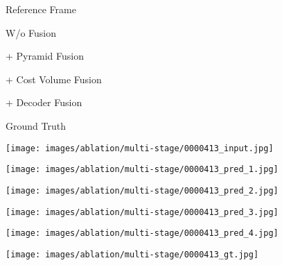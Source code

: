 \documentclass[10pt,twocolumn,letterpaper]{article}
\begin{document}
\begin{figure*}
    \captionsetup[subfigure]{labelformat=empty}
        \begin{subfigure}[b]{0.166\linewidth}
        \caption{Reference Frame}
        \end{subfigure}\hfill
        \begin{subfigure}[b]{0.166\linewidth}
        \caption{W/o Fusion}
        \end{subfigure}\hfill
        \begin{subfigure}[b]{0.166\linewidth}
        \caption{+ Pyramid Fusion}
        \end{subfigure}\hfill
        \begin{subfigure}[b]{0.166\linewidth}
        \caption{+ Cost Volume Fusion}
        \end{subfigure}\hfill
        \begin{subfigure}[b]{0.166\linewidth}
        \caption{+ Decoder Fusion}
        \end{subfigure}\hfill
        \begin{subfigure}[b]{0.166\linewidth}
        \caption{Ground Truth}
        \end{subfigure}\hfill
    \vspace{-3pt}

    \begin{subfigure}[b]{0.166\linewidth}
    \texttt{[image: images/ablation/multi-stage/0000413\_input.jpg]}
    \end{subfigure}\hfill
    \begin{subfigure}[b]{0.166\linewidth}
    \texttt{[image: images/ablation/multi-stage/0000413\_pred\_1.jpg]}
    \end{subfigure}\hfill
    \begin{subfigure}[b]{0.166\linewidth}
    \texttt{[image: images/ablation/multi-stage/0000413\_pred\_2.jpg]}
    \end{subfigure}\hfill
    \begin{subfigure}[b]{0.166\linewidth}
    \texttt{[image: images/ablation/multi-stage/0000413\_pred\_3.jpg]}
    \end{subfigure}\hfill
    \begin{subfigure}[b]{0.166\linewidth}
    \texttt{[image: images/ablation/multi-stage/0000413\_pred\_4.jpg]}
    \end{subfigure}\hfill
    \begin{subfigure}[b]{0.166\linewidth}
    \texttt{[image: images/ablation/multi-stage/0000413\_gt.jpg]}
    \end{subfigure}\hfill
    

\end{figure*}
\end{document}

